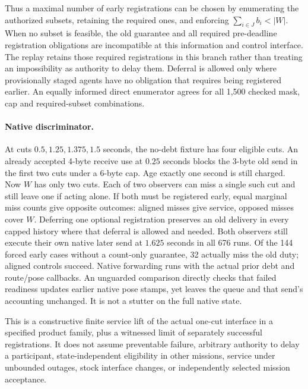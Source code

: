 \documentclass{article}
\begin{document}
Thus a maximal number of early registrations can be chosen by
enumerating the authorized subsets, retaining the required ones,
and enforcing \(\sum_{i\in J} b_i<|W|\). When no subset is
feasible, the old guarantee and all required pre-deadline
registration obligations are incompatible at this information and
control interface. The replay retains those required registrations
in this branch rather than treating an impossibility as authority
to delay them. Deferral is allowed only where provisionally staged
agents have no obligation that requires being registered earlier.
An equally informed direct enumerator agrees for all 1,500 checked
mask, cap and required-subset combinations.

\paragraph{Native discriminator.}
At cuts \(0.5,1.25,1.375,1.5\) seconds, the no-debt fixture has
four eligible cuts. An already accepted 4-byte receive use at
\(0.25\) seconds blocks the 3-byte old send in the first two
cuts under a 6-byte cap. Age exactly one second is still charged.
Now \(W\) has only two cuts. Each of two observers can miss a
single such cut and still leave one if acting alone. If both
must be registered early, equal marginal miss counts give
opposite outcomes: aligned misses give service, opposed misses
cover \(W\). Deferring one optional registration preserves an
old delivery in every capped history where that deferral is
allowed and needed. Both observers still execute their own native
later send at \(1.625\) seconds in all 676 runs. Of the 144
forced early cases without a count-only guarantee, 32 actually
miss the old duty; aligned controls succeed. Native forwarding
runs with the actual prior debt and route/pose callbacks.
An unguarded comparison directly checks that failed readiness
updates earlier native pose stamps, yet leaves the queue and
that send's accounting unchanged. It is not a stutter on the
full native state.

This is a constructive finite service lift of the actual one-cut
interface in a specified product family, plus a witnessed limit
of separately successful registrations. It does not assume
preventable failure, arbitrary authority to delay a participant,
state-independent eligibility in other missions, service under
unbounded outages, stock interface changes, or independently
selected mission acceptance.
\end{document}
